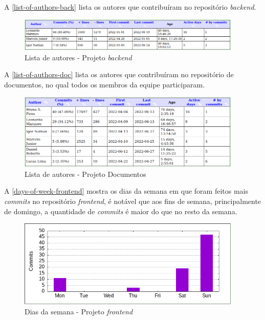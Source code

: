 A \autoref{list-of-authors-back} lista os autores que contribuíram no repositório \textit{\gls{backend}}.
\begin{figure}[H]
	\centering
	\caption{\label{list-of-authors-back}Lista de autores - Projeto \textit{\gls{backend}}}
	\includegraphics[width=0.95\textwidth]{../imagens/stats/list-of-authors-backend.png}
\end{figure}

A \autoref{list-of-authors-doc} lista os autores que contribuíram no repositório de documentos, no qual todos os membros da equipe participaram.
\begin{figure}[H]
	\centering
	\caption{\label{list-of-authors-doc}Lista de autores - Projeto Documentos}
	\includegraphics[width=0.95\textwidth]{../imagens/stats/list-of-authors-documentos.png}
\end{figure}

A \autoref{days-of-week-frontend} mostra os dias da semana em que foram feitos mais \textit{commits} no repositório \textit{\gls{frontend}}, é notável que aos fins de semana, principalmente de domingo, a quantidade de \textit{commits} é maior do que no resto da semana.
\begin{figure}[H]
	\centering
	\caption{\label{days-of-week-frontend}Dias da semana - Projeto \textit{\gls{frontend}}}
	\includegraphics[width=0.95\textwidth]{../imagens/stats/days-of-week-frontend.png}
\end{figure}

